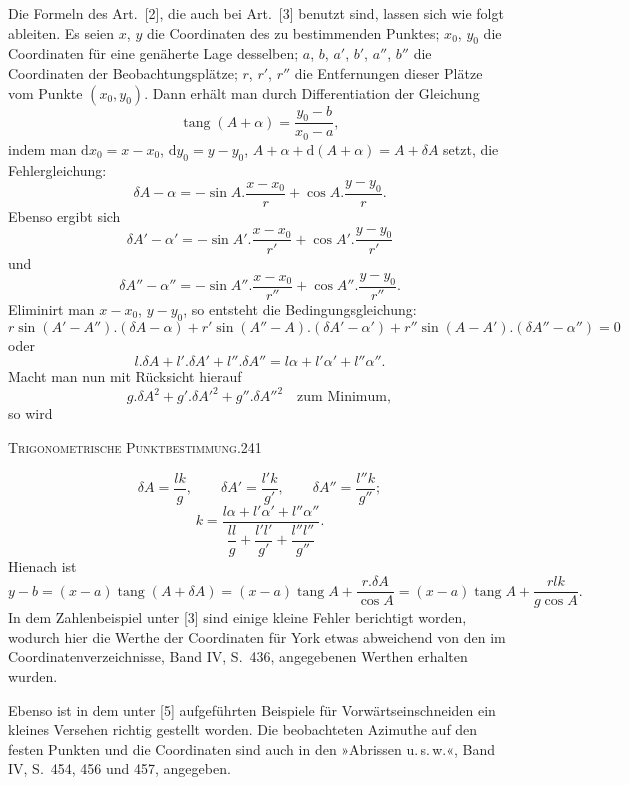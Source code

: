 Die Formeln des Art.~[2], die auch bei Art.~[3] benutzt sind, lassen sich wie folgt ableiten. Es seien $x$, $y$ die Coordinaten des zu bestimmenden Punktes; $x_0$, $y_0$ die Coordinaten für eine genäherte Lage desselben; $a$, $b$, $a'$, $b'$, $a''$, $b''$ die Coordinaten der Beobachtungsplätze; $r$, $r'$, $r''$ die Entfernungen dieser Plätze vom Punkte $(x_0,y_0)$. Dann erhält man durch Differentiation der Gleichung
\[
\operatorname{tang}(A+\alpha)=\frac{y_0-b}{x_0-a},
\]
indem man $\mathrm dx_0=x-x_0$, $\mathrm dy_0=y-y_0$, $A+\alpha+\mathrm d(A+\alpha)=A+\delta A$ setzt, die Fehlergleichung:
\[
\delta A-\alpha=-\sin A.\frac{x-x_0}{r}+\cos A.\frac{y-y_0}{r}.
\]
Ebenso ergibt sich
\[
\delta A'-\alpha'=-\sin A'.\frac{x-x_0}{r'}+\cos A'.\frac{y-y_0}{r'}
\]
und
\[
\delta A''-\alpha''=-\sin A''.\frac{x-x_0}{r''}+\cos A''.\frac{y-y_0}{r''}.
\]
Eliminirt man $x-x_0$, $y-y_0$, so entsteht die Bedingungsgleichung:
\[
r\sin(A'-A'').(\delta A-\alpha)+r'\sin(A''-A).(\delta A'-\alpha')+r''\sin(A-A').(\delta A''-\alpha'')=0
\]
oder
\[
l.\delta A+l'.\delta A'+l''.\delta A''=l\alpha+l'\alpha'+l''\alpha''.
\]
Macht man nun mit Rücksicht hierauf
\[
g.\delta A^2+g'.\delta A'^2+g''.\delta A''^2\quad\text{zum Minimum},
\]
so wird
\par\endgroup

\clearpage
\noindent\mbox{}\hfill\textsc{Trigonometrische Punktbestimmung.}\hfill241\par\medskip
\begingroup\footnotesize
\[
\delta A=\frac{lk}{g},\qquad\delta A'=\frac{l'k}{g'},\qquad\delta A''=\frac{l''k}{g''};
\]
\[
k=\frac{l\alpha+l'\alpha'+l''\alpha''}{\dfrac{ll}{g}+\dfrac{l'l'}{g'}+\dfrac{l''l''}{g''}}.
\]
Hienach ist
\[
y-b=(x-a)\operatorname{tang}(A+\delta A)=(x-a)\operatorname{tang}A+\frac{r.\delta A}{\cos A}
=(x-a)\operatorname{tang}A+\frac{rlk}{g\cos A}.
\]
In dem Zahlenbeispiel unter [3] sind einige kleine Fehler berichtigt worden, wodurch hier die Werthe der Coordinaten für York etwas abweichend von den im Coordinatenverzeichnisse, Band IV, S.~436, angegebenen Werthen erhalten wurden.

Ebenso ist in dem unter [5] aufgeführten Beispiele für Vorwärtseinschneiden ein kleines Versehen richtig gestellt worden. Die beobachteten Azimuthe auf den festen Punkten und die Coordinaten sind auch in den »Abrissen u.\,s.\,w.«, Band IV, S.~454, 456 und 457, angegeben.


